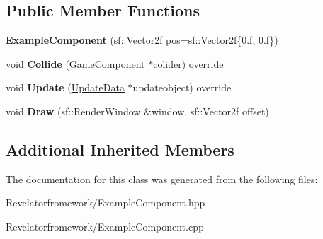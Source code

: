 \subsection*{Public Member Functions}
\begin{DoxyCompactItemize}
\item 
\hypertarget{class_example_component_a09d97ad014e5ebe38220da6c80e96873}{{\bfseries Example\-Component} (sf\-::\-Vector2f pos=sf\-::\-Vector2f\{0.f, 0.f\})}\label{class_example_component_a09d97ad014e5ebe38220da6c80e96873}

\item 
\hypertarget{class_example_component_a6ab733042d45aaa046201f486ece06b5}{void {\bfseries Collide} (\hyperlink{class_game_component}{Game\-Component} $\ast$colider) override}\label{class_example_component_a6ab733042d45aaa046201f486ece06b5}

\item 
\hypertarget{class_example_component_a74028c9fbf9ec0fc523e60416433eacb}{void {\bfseries Update} (\hyperlink{class_update_data}{Update\-Data} $\ast$updateobject) override}\label{class_example_component_a74028c9fbf9ec0fc523e60416433eacb}

\item 
\hypertarget{class_example_component_a385a5f04cdf04e91c8340632a1af9edc}{void {\bfseries Draw} (sf\-::\-Render\-Window \&window, sf\-::\-Vector2f offset)}\label{class_example_component_a385a5f04cdf04e91c8340632a1af9edc}

\end{DoxyCompactItemize}
\subsection*{Additional Inherited Members}


The documentation for this class was generated from the following files\-:\begin{DoxyCompactItemize}
\item 
Revelatorfromework/Example\-Component.\-hpp\item 
Revelatorfromework/Example\-Component.\-cpp\end{DoxyCompactItemize}
